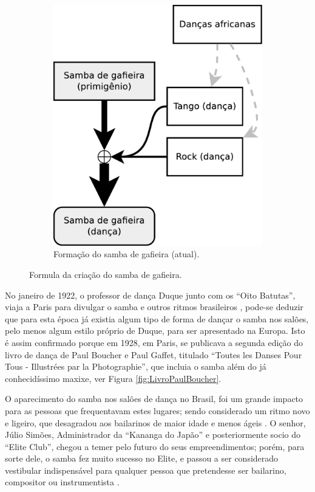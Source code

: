 \begin{figure}[h]
\begin{subfigure}[b]{0.37\textwidth}
    \includegraphics[width=\textwidth]{chapters/cap-historia-sambagafieira/sambagafieiraformula2.eps}
    \caption{Formação do samba de gafieira (atual).}
    \label{fig:formuladosambagafieira2}
  \end{subfigure}
\caption{Formula da criação do samba de gafieira.}
\label{fig:formuladosambagafieiraall}
\end{figure}


No janeiro de 1922, o professor de dança Duque junto com os ``Oito Batutas'', 
viaja a Paris para divulgar o samba e outros ritmos brasileiros
\cite[pp. 13]{duque1922:a} \cite[pp. 465]{marcondes1977enciclopedia},
pode-se deduzir que para esta época já existia algum tipo de forma de dançar o samba nos salões, 
pelo menos algum estilo próprio de Duque,
para ser apresentado na Europa. Isto é assim confirmado porque em 1928,
em Paris, se publicava a segunda edição do livro de dança de Paul Boucher e Paul Gaffet,
titulado
``Toutes les Danses Pour Tous - Illustrées par la Photographie'',
que incluia o samba além do já conhecidíssimo maxixe, ver Figura \ref{fig:LivroPaulBoucher}.


O aparecimento do samba nos salões de dança no Brasil, 
foi um grande impacto para as pessoas que frequentavam estes lugares;
sendo considerado um ritmo novo e ligeiro,
que desagradou aos bailarinos de maior idade e menos ágeis \cite[pp. 6 - cad. B]{entrevistajuliojournalbrasil1}.
O senhor, Júlio Simões, Administrador da ``Kananga do Japão'' e posteriormente socio
do ``Elite Club'', chegou a temer pelo futuro do seus empreendimentos; porém, para sorte dele, 
o samba fez muito sucesso no Elite,
e passou a ser considerado vestibular indispensável para qualquer pessoa que pretendesse ser bailarino, 
compositor ou instrumentista \cite[pp. 6 - cad. B]{entrevistajuliojournalbrasil1}.

